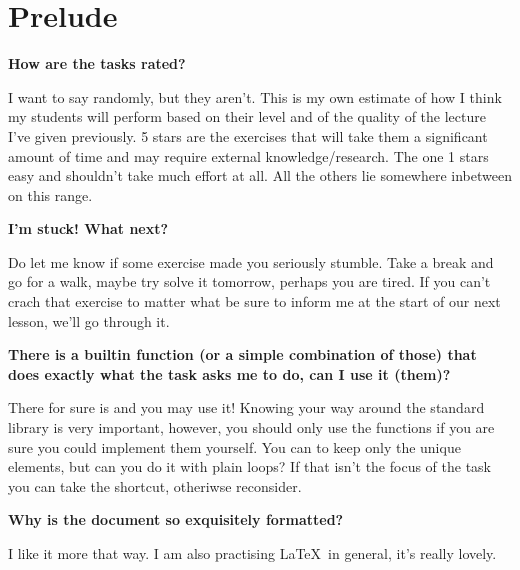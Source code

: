



\setcounter{section}{-1}
\section{Prelude}

\begin{flushleft}
\textbf{How are the tasks rated?}
\end{flushleft}
\begin{flushright}
I want to say randomly, but they aren't. This is my own estimate of how I think
my students will perform based on their level and of the quality of the lecture
I've given previously. 5 stars are the exercises that will take them a
significant amount of time and may require external knowledge/research.
The one 1 stars easy and shouldn't take much effort at all. All the others lie 
somewhere inbetween on this range.
\end{flushright}

\begin{flushleft}
\textbf{I'm stuck! What next?}
\end{flushleft}
\begin{flushright}
Do let me know if some exercise made you seriously stumble. Take a break and
go for a walk, maybe try solve it tomorrow, perhaps you are tired. If you can't
crach that exercise to matter what be sure to inform me at the start of our
next lesson, we'll go through it.
\end{flushright}

\begin{flushleft}
\textbf{There is a builtin function (or a simple combination of those) that does
exactly what the task asks me to do, can I use it (them)?}
\end{flushleft}
\begin{flushright}
There for sure is and you may use it! Knowing your way around the standard library
is very important, however, you should only use the functions if you are sure
you could implement them yourself. You can \hbox{} to 
keep only the unique elements, but can you do it with plain  loops? If 
that isn't the focus of the task you can take the shortcut, otheriwse reconsider.
\end{flushright}

\begin{flushleft}
\textbf{Why is the document so exquisitely formatted?}
\end{flushleft}
\begin{flushright}
I like it more that way. I am also practising \LaTeX\ in general,
it's really lovely.
\end{flushright}


